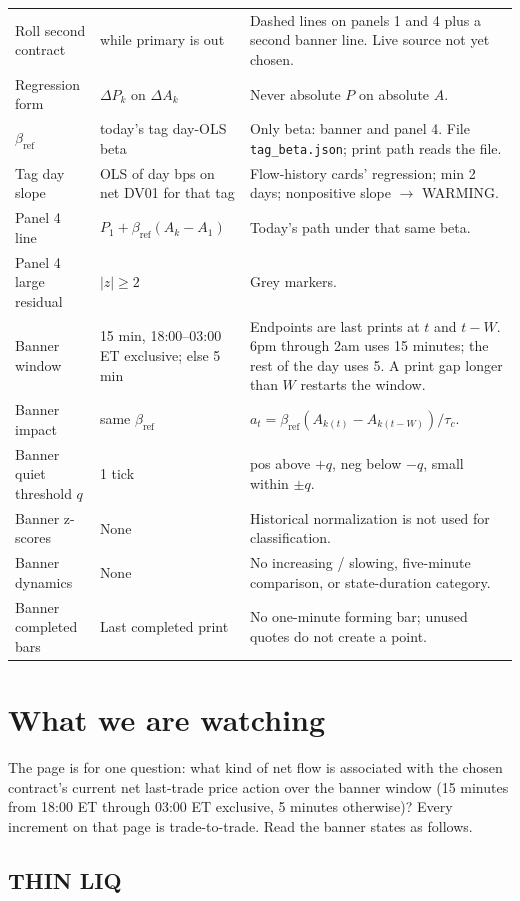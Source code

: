 \documentclass[11pt]{article}
\begin{document}
\begin{longtable}{@{}p{}p{}p{}@{}}
Roll second contract & while primary is out & Dashed lines on panels 1 and 4 plus a second banner line. Live source not yet chosen. \\
Regression form & $\Delta P_k$ on $\Delta A_k$ & Never absolute $P$ on absolute $A$. \\
$\beta_{\mathrm{ref}}$ & today's tag day-OLS beta & Only beta: banner and panel 4. File \texttt{tag\_beta.json}; print path reads the file. \\
Tag day slope & OLS of day bps on net DV01 for that tag & Flow-history cards' regression; min 2 days; nonpositive slope $\to$ WARMING. \\
Panel 4 line & $P_1+\beta_{\mathrm{ref}}(A_k-A_1)$ & Today's path under that same beta. \\
Panel 4 large residual & $|z|\geq 2$ & Grey markers. \\
Banner window & 15 min, 18:00--03:00 ET exclusive; else 5 min & Endpoints are last prints at $t$ and $t-W$. 6pm through 2am uses 15 minutes; the rest of the day uses 5. A print gap longer than $W$ restarts the window. \\
Banner impact & same $\beta_{\mathrm{ref}}$ & $a_t=\beta_{\mathrm{ref}}(A_{k(t)}-A_{k(t-W)})/\tau_c$. \\
Banner quiet threshold $q$ & 1 tick & pos above $+q$, neg below $-q$, small within $\pm q$. \\
Banner z-scores & None & Historical normalization is not used for classification. \\
Banner dynamics & None & No increasing / slowing, five-minute comparison, or state-duration category. \\
Banner completed bars & Last completed print & No one-minute forming bar; unused quotes do not create a point. \\
\bottomrule
\end{longtable}
\normalsize

\section{What we are watching}

The page is for one question: what kind of net flow is associated with the chosen contract's current net last-trade price action over the banner window (15 minutes from 18:00 ET through 03:00 ET exclusive, 5 minutes otherwise)? Every increment on that page is trade-to-trade. Read the banner states as follows.

\subsection{THIN LIQ}
\end{document}
